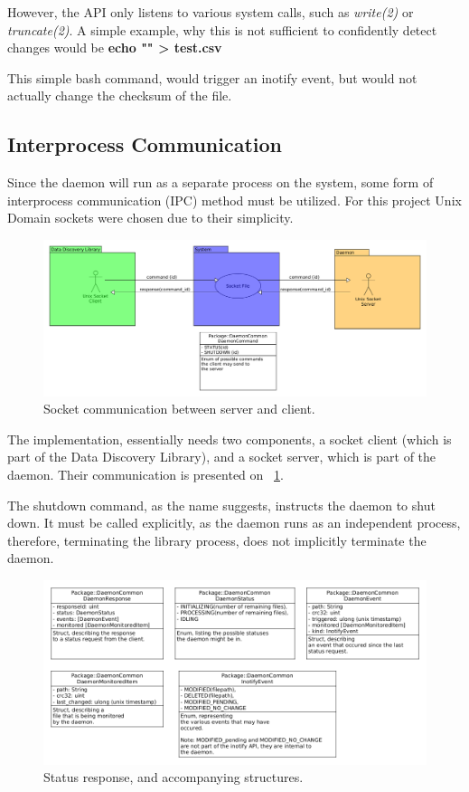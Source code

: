 However, the API only listens to various system calls, such as \textit{write(2)} or \textit{truncate(2)}.
A simple example, why this is not sufficient to confidently detect changes would be \textbf{echo "" > test.csv}

This simple bash command, would trigger an inotify event, but would not actually change the checksum of the file.

\subsection{Interprocess Communication}
Since the daemon will run as a separate process on the system, some form of interprocess communication (IPC) method
must be utilized.
For this project Unix Domain sockets were chosen due to their simplicity.

\begin{figure}[h]
    \centering
    \includegraphics[width=12cm]{figures/daemon/socket_communication}
    \caption{Socket communication between server and client.}
    \label{fig:daemon_fig_1}
\end{figure}


The implementation, essentially needs two components, a socket client (which is part of the Data Discovery Library),
and a socket server, which is part of the daemon.
Their communication is presented on ~\ref{fig:daemon_fig_1}.

The shutdown command, as the name suggests, instructs the daemon to shut down.
It must be called explicitly, as the daemon runs as an independent process, therefore,
terminating the library process, does not implicitly terminate the daemon.

\begin{figure}[h]
    \centering
    \includegraphics[width=12cm]{figures/daemon/daemon_response}
    \caption{Status response, and accompanying structures.}
    \label{fig:daemon_fig_2}
\end{figure}


